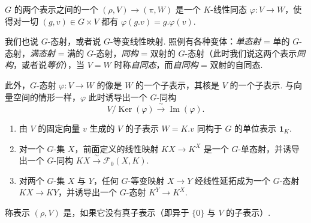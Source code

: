 \begin{definition}\label{def:fg-4-1-4}
$G$ 的两个表示之间的一个 $(\rho,V)\longrightarrow(\pi,W)$ 是一个 $K$-线性同态 $\varphi:V\longrightarrow W$，使得对一切 $(g,v)\in G\times V$ 都有 $\varphi(g.v)=g.\varphi(v)$.
\end{definition}

我们也说 $G$-态射，或者说 $G$-等变线性映射. 照例有各种变体：\emph{单态射} = 单的 $G$-态射，\emph{满态射} = 满的 $G$-态射，\emph{同构} = 双射的 $G$-态射（此时我们说这两个表示\emph{同构}，或者说\emph{等价}），当 $V=W$ 时称\emph{自同态}，而\emph{自同构} = 双射的自同态.

此外，$G$-态射 $\varphi:V\longrightarrow W$ 的像是 $W$ 的一个子表示，其核是 $V$ 的一个子表示. 与向量空间的情形一样，$\varphi$ 此时诱导出一个 $G$-同构
\[
V/\operatorname{Ker}(\varphi)\xrightarrow{\ \sim\ }\operatorname{Im}(\varphi).
\]
\begin{numpara}[例]\label{np:fg-4-1-5}
\begin{enumerate}[label=\roman*)]
\item 由 $V$ 的固定向量 $v$ 生成的 $V$ 的子表示 $W=K.v$ 同构于 $G$ 的单位表示 $\mathbf{1}_K$.
\item 对一个 $G$-集 $X$，前面定义的线性映射 $KX\longrightarrow K^X$ 是一个 $G$-单态射，并诱导出一个 $G$-同构 $KX\xrightarrow{\ \sim\ }\mathcal{F}_0(X,K)$.
\item 对两个 $G$-集 $X$ 与 $Y$，任何 $G$-等变映射 $X\longrightarrow Y$ 经线性延拓成为一个 $G$-态射 $KX\longrightarrow KY$，并诱导出一个 $G$-态射 $K^Y\longrightarrow K^X$.
\end{enumerate}
\end{numpara}

\begin{definition}\label{def:fg-4-1-6}
称表示 $(\rho,V)$ 是，如果它没有真子表示（即异于 $\{0\}$ 与 $V$ 的子表示）.
\end{definition}

